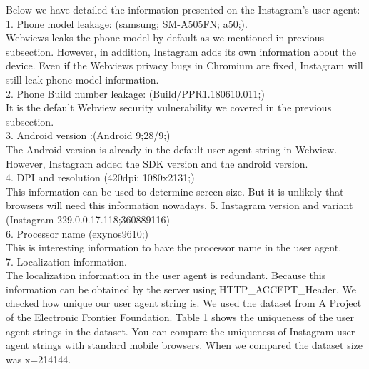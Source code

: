 Below we have detailed the information presented on the Instagram's user-agent:\\
1. Phone model leakage: (samsung; SM-A505FN; a50;).\\
Webviews leaks the phone model by default as we mentioned in previous subsection. However, in addition, Instagram adds its own information about the device. Even if the Webviews privacy bugs in Chromium are fixed, Instagram will still leak phone model information.\\
2.  Phone Build number leakage: (Build/PPR1.180610.011;)\\
It is the default Webview security vulnerability we covered in the previous subsection.\\
3. Android version :(Android 9;28/9;) \\
The Android version is already in the default user agent string in Webview. However, Instagram added the SDK version and the android version.\\
4. DPI and resolution (420dpi; 1080x2131;)\\
This information can be used to determine screen size. But it is unlikely that browsers will need this information nowadays.
5. Instagram version and variant (Instagram 229.0.0.17.118;360889116)\\
6. Processor name (exynos9610;)\\
This is interesting information to have the processor name in the user agent.\\
7. Localization information. \\
The localization information in the user agent is redundant. Because this information can be obtained by the server using HTTP\_ACCEPT\_Header.
We checked how unique our user agent string is. We used the dataset from A Project of the Electronic Frontier Foundation\cite{tracks}. Table 1 shows the uniqueness of the user agent strings in the dataset. You can compare the uniqueness of Instagram user agent strings with standard mobile browsers.
When we compared the dataset size was x=214144.

